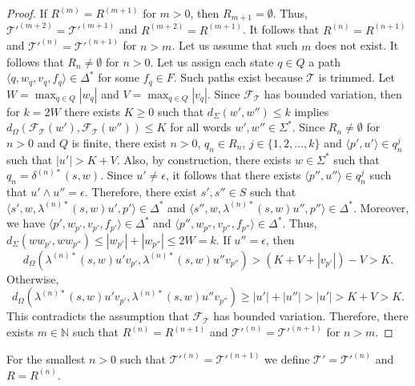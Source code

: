 \begin{proof}
  If $R^{(m)} = R^{(m+1)}$ for $m > 0$, then $R_{m+1} = \emptyset$. Thus,
  $\mathcal{T}'^{(m+2)} = \mathcal{T}'^{(m+1)}$ and $R^{(m+2)} = R^{(m+1)}$. It
  follows that $R^{(n)} = R^{(n+1)}$ and $\mathcal{T}'^{(n)} = \mathcal{T}'^{(n+1)}$
  for $n > m$.
  Let us assume that such $m$ does not exist.
  It follows that $R_n \neq \emptyset$ for $n > 0$.
  Let us assign each state $q \in Q$ a path $\langle q, w_q, v_q, f_q \rangle \in
  \Delta^*$ for some $f_q \in F$.
  Such paths exist because $\mathcal{T}$ is trimmed.
  Let $W = \max_{q \in Q}{|w_q|}$ and $V = \max_{q \in Q}{|v_q|}$.
  Since $\mathcal{F}_\mathcal{T}$ has bounded variation, then for $k = 2W$ there
  exists $K \geq 0$ such that $d_\Sigma(w', w'') \leq k$ implies
  $d_\Omega(\mathcal{F}_\mathcal{T}(w'), \mathcal{F}_\mathcal{T}(w'')) \leq K$ for
  all words $w', w'' \in \Sigma^*$.
  Since $R_n \neq \emptyset$ for $n > 0$ and $Q$ is finite, there exist $n > 0$, $q_n
  \in R_n$, $j \in \{ 1, 2, \ldots, k \}$ and $\langle p', u' \rangle \in q_n^j$ such
  that $|u'| > K + V$.
  Also, by construction, there exists $w \in \Sigma^*$ such that $q_n =
  \delta^{(n)*}(s, w)$.
  Since $u' \neq \epsilon$, it follows that there exists $\langle p'', u'' \rangle
  \in q_n^j$ such that $u' \wedge u'' = \epsilon$.
  Therefore, there exist $s', s'' \in S$  such that $\langle s', w, \lambda^{(n)*}(s,
  w)u', p' \rangle \in \Delta^*$ and $\langle s'', w, \lambda^{(n)*}(s, w)u'', p''
  \rangle \in \Delta^*$.
  Moreover, we have $\langle p', w_{p'}, v_{p'}, f_{p'} \rangle \in \Delta^*$ and
  $\langle p'', w_{p''}, v_{p''}, f_{p''} \rangle \in \Delta^*$.
  Thus, $d_\Sigma(ww_{p'}, ww_{p''}) \leq |w_{p'}| + |w_{p''}| \leq 2W = k$. If $u''
  = \epsilon$, then
  \begin{equation*}
    d_\Omega(\lambda^{(n)*}(s, w)u'v_{p'}, \lambda^{(n)*}(s, w)u''v_{p''}) > (K + V
    + |v_{p'}|) - V > K.
  \end{equation*}
  Otherwise,
  \begin{equation*}
    d_\Omega(\lambda^{(n)*}(s, w)u'v_{p'}, \lambda^{(n)*}(s, w)u''v_{p''}) \geq |u'|
    + |u''| > |u'| > K + V > K.
  \end{equation*}
  This contradicts the assumption that $\mathcal{F}_\mathcal{T}$ has bounded
  variation. Therefore, there exists $m \in \mathbb{N}$ such that $R^{(n)} =
  R^{(n+1)}$ and $\mathcal{T}'^{(n)} = \mathcal{T}'^{(n+1)}$ for $n > m$.
\end{proof}

For the smallest $n > 0$ such that $\mathcal{T}'^{(n)} = \mathcal{T}'^{(n+1)}$ we
define $\mathcal{T}' = \mathcal{T}'^{(n)}$ and $R = R^{(n)}$.

